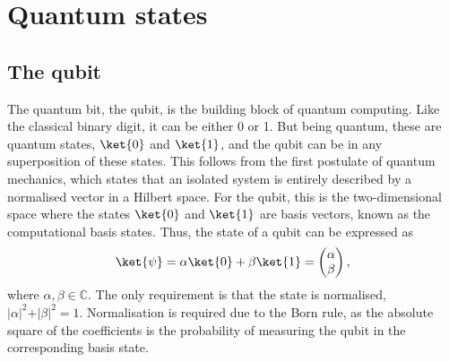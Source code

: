 \section{Quantum states}
\subsection{The qubit}
The quantum bit, the qubit, is the building block of quantum computing.
Like the classical binary digit, it can be either 0 or 1.
But being quantum, these are quantum states, $\ket{0}$ and $\ket{1}$\footnotemark[1]{}, and the qubit can be in any superposition of these states.
This follows from the first postulate of quantum mechanics\footnotemark[2], which states that an isolated system is entirely described by a normalised vector in a Hilbert space.
For the qubit, this is the two-dimensional space where the states $\ket{0}$ and $\ket{1}$ are basis vectors, known as the computational basis states.
Thus, the state of a qubit can be expressed as
\begin{equation}
    \ket{\psi} = \alpha \ket{0} + \beta \ket{1} = \begin{pmatrix} \alpha \\ \beta \end{pmatrix},
    \label{eq:qubit}
\end{equation}
where $\alpha, \beta \in \mathbb{C}$.
The only requirement is that the state is normalised, $\vert\alpha\vert^2 + \vert\beta\vert^2 = 1$.
Normalisation is required due to the Born rule, as the absolute square of the coefficients is the probability of measuring the qubit in the corresponding basis state.



